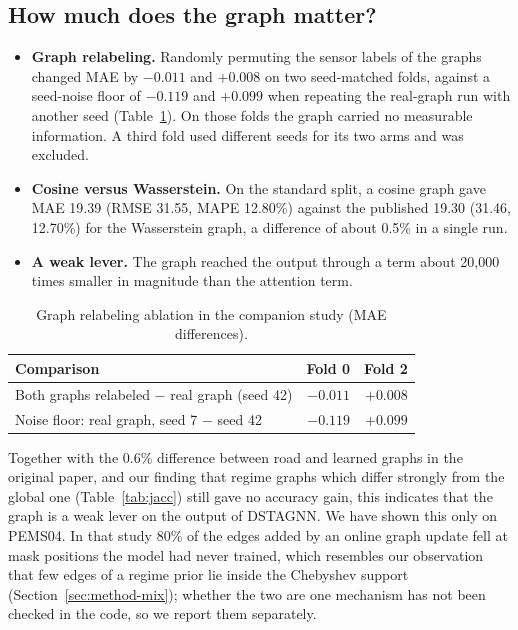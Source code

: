 \documentclass[conference]{IEEEtran}
\begin{document}
\subsection{How much does the graph matter?}
\begin{itemize}
\item \textbf{Graph relabeling.} Randomly permuting the sensor labels of the graphs changed MAE by $-0.011$ and $+0.008$ on two seed-matched folds, against a seed-noise floor of $-0.119$ and $+0.099$ when repeating the real-graph run with another seed (Table~\ref{tab:relabel}). On those folds the graph carried no measurable information. A third fold used different seeds for its two arms and was excluded.
\item \textbf{Cosine versus Wasserstein.} On the standard split, a cosine graph gave MAE 19.39 (RMSE 31.55, MAPE 12.80\%) against the published 19.30 (31.46, 12.70\%) for the Wasserstein graph, a difference of about 0.5\% in a single run.
\item \textbf{A weak lever.} The graph reached the output through a term about 20,000 times smaller in magnitude than the attention term.
\end{itemize}
\begin{table}[t]
\centering\caption{Graph relabeling ablation in the companion study (MAE differences).}\label{tab:relabel}
\footnotesize
\begin{tabular}{@{}lrr@{}}
\toprule
Comparison & Fold 0 & Fold 2\\
\midrule
Both graphs relabeled $-$ real graph (seed 42) & $-0.011$ & $+0.008$\\
Noise floor: real graph, seed 7 $-$ seed 42 & $-0.119$ & $+0.099$\\
\bottomrule
\end{tabular}
\end{table}
Together with the 0.6\% difference between road and learned graphs in the original paper, and our finding that regime graphs which differ strongly from the global one (Table~\ref{tab:jacc}) still gave no accuracy gain, this indicates that the graph is a weak lever on the output of DSTAGNN. We have shown this only on PEMS04. In that study 80\% of the edges added by an online graph update fell at mask positions the model had never trained, which resembles our observation that few edges of a regime prior lie inside the Chebyshev support (Section~\ref{sec:method-mix}); whether the two are one mechanism has not been checked in the code, so we report them separately.
\end{document}
